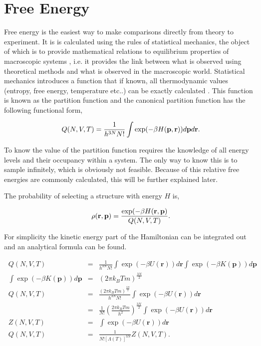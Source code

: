 \section{Free Energy} \label{sec:free_energy}

Free energy is the easiest way to make comparisons directly from theory to experiment. It is is calculated using the rules of statistical mechanics, the object of which is to provide mathematical relations to equilibrium properties of macroscopic systems \cite{intro_stat_thermodynamics}, i.e. it provides the link between what is observed using theoretical methods and what is observed in the macroscopic world.  Statistical mechanics introduces a function that if known, all thermodynamic values (entropy, free energy, temperature etc..) can be exactly calculated \cite{stat_mech_surv_guide}.  This function is known as the partition function and the canonical partition function has the following functional form,

\begin{equation}
\ Q(N,V,T)= \frac{1}{h^{3N}N!}\int \exp(-\beta H(\mathbf{p}, \mathbf{r})) d\mathbf{p} d\mathbf{r} \\.
\end{equation}

To know the value of the partition function requires the knowledge of all energy levels and their occupancy within a system.  The only way to know this is to sample infinitely, which is obviously not feasible.  Because of this relative free energies are commonly calculated, this will be further explained later.

The probability of selecting a structure with energy $H$ is,

\begin{equation}
\ \rho(\mathbf{r}, \mathbf{p}) = \frac{\exp(-\beta H(\mathbf{r}, \mathbf{p})}{Q(N,V,T)} \\.
\end{equation}

For simplicity the kinetic energy part of the Hamiltonian can be integrated out and an analytical formula can be found.

\begin{eqnarray}
\ Q(N,V,T) &=& \frac{1}{h^{3N}N!}\int \exp(-\beta U(\mathbf{r}))d \mathbf{r} \int \exp(-\beta K(\mathbf{p}))d \mathbf{p} \\ \label{eq:kinetic_integration}
\ \int \exp(-\beta K(\mathbf{p}))d \mathbf{p} &=& (2 \pi k_B Tm )^{\frac{3N}{2}} \\
\ Q(N,V,T) &=& \frac{(2 \pi k_B Tm )^{\frac{3N}{2}}}{h^{3N}N!} \int \exp(-\beta U(\mathbf{r}))d \mathbf{r} \\
\ &=& \frac{1}{N!} \left( \frac{2 \pi k_B T m}{h^2} \right)^{\frac{3N}{2}} \int \exp(-\beta U(\mathbf{r}))d \mathbf{r} \\
\ Z(N,V,T) &=& \int \exp(-\beta U(\mathbf{r}))d \mathbf{r} \\
\ Q(N,V,T) &=& \frac{1}{N![\Lambda(T)]^{3N}} Z(N,V,T) .
\end{eqnarray}


